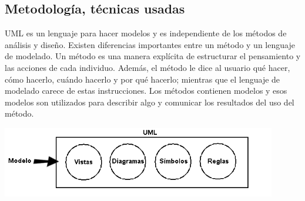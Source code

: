 \documentclass[preprint,12pt]{elsarticle}
\begin{document}
		\subsection{\textbf{ Metodología, técnicas usadas  }}
		UML es un lenguaje para hacer modelos y es independiente de los métodos de análisis y diseño. Existen diferencias importantes entre un método y un lenguaje de modelado. Un método es una manera explícita de estructurar el pensamiento y las acciones de cada individuo. Además, el método le dice al usuario qué hacer, cómo hacerlo, cuándo hacerlo y por qué hacerlo; mientras que el lenguaje de modelado carece de estas instrucciones. Los métodos contienen modelos y esos modelos son utilizados para describir algo y comunicar los resultados del uso del método.\cite{refaquino2}
		\begin{center}
	\includegraphics[width=12cm]{./imagen/5} 
	\end{center}
		
\end{document}
